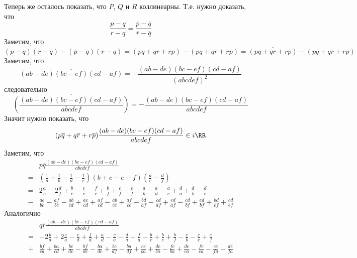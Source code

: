 \documentclass[12pt,a4paper]{article}
\begin{document}
\begin{enumproblem}[2.42]
        Теперь же осталось показать, что $P$, $Q$ и $R$ коллинеарны. Т.е. нужно доказать, что
        \[\frac{p - q}{r - q} = \frac{\overline{p} - \overline{q}}{\overline{r} - \overline{q}}\]
        Заметим, что
        \[
            (p - q)(\overline{r} - \overline{q}) - (\overline{p} - \overline{q})(r - q)
            = (\overline{p}q + \overline{q}r + \overline{r}p) - (p\overline{q} + q\overline{r} + r\overline{p})
            = \overline{(p\overline{q} + q\overline{r} + r\overline{p})} - (p\overline{q} + q\overline{r} + r\overline{p})
        \]
        Заметим, что
        \[\overline{(ab - de)(bc - ef)(cd - af)} = -\frac{(ab - de)(bc - ef)(cd - af)}{(abcdef)^2}\]
        следовательно
        \[\overline{\left(\frac{(ab - de)(bc - ef)(cd - af)}{abcdef}\right)} = -\frac{(ab - de)(bc - ef)(cd - af)}{abcdef}\]
        Значит нужно показать, что
        \[(p\overline{q} + q\overline{r} + r\overline{p}) \frac{(ab - de)(bc - ef)(cd - af)}{abcdef} \in i\RR\]
        Заметим, что
        \begin{align*}
            &p\overline{q} \frac{(ab - de)(bc - ef)(cd - af)}{abcdef}\\
            =& \left(\frac{1}{a} + \frac{1}{b} - \frac{1}{d} - \frac{1}{e}\right)(b + c - e - f)\left(\frac{a}{c} - \frac{d}{f}\right)\\
            =& 2\frac{a}{c} - 2\frac{d}{f} + \frac{b}{c} - \frac{e}{c} - \frac{f}{c} + \frac{b}{f} + \frac{c}{f} - \frac{e}{f} + \frac{a}{b} - \frac{a}{d} - \frac{a}{e} + \frac{d}{a} + \frac{d}{b} - \frac{d}{e}\\
            -& \frac{ae}{bc} - \frac{af}{bc} - \frac{ab}{cd} + \frac{ae}{cd} + \frac{af}{cd} - \frac{ab}{ce} + \frac{af}{ce}
            - \frac{bd}{af} - \frac{cd}{af} + \frac{ed}{af} - \frac{cd}{bf} + \frac{ed}{bf} + \frac{bd}{ef} + \frac{cd}{ef}
        \end{align*}
        Аналогично
        \begin{align*}
            &q\overline{r} \frac{(ab - de)(bc - ef)(cd - af)}{abcdef}\\
            =& -2\frac{b}{d} + 2\frac{e}{a} - \frac{c}{d} + \frac{f}{d} + \frac{a}{d} - \frac{c}{a} - \frac{d}{a} + \frac{f}{a} - \frac{b}{c} + \frac{b}{e} + \frac{b}{f} - \frac{e}{b} - \frac{e}{c} + \frac{e}{f}\\
            +& \frac{bf}{cd} + \frac{ba}{cd} + \frac{bc}{de} - \frac{bf}{de} - \frac{ba}{de} + \frac{bc}{df} - \frac{ba}{df}
            + \frac{ce}{ba} + \frac{de}{ba} - \frac{fe}{ba} + \frac{de}{ca} - \frac{fe}{ca} - \frac{ce}{fa} - \frac{de}{fa}

\end{align*}
\end{enumproblem}
\end{document}
